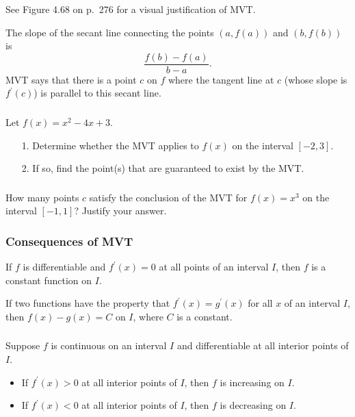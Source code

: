 \documentclass[14pt]{beamer}
\begin{document}
\begin{frame}
\small
See Figure 4.68 on p.\ 276 for a visual justification of MVT.  

\vspace{1pc} 
The slope of the secant line connecting the points $(a,f(a))$ and $(b,f(b))$ is 
\[\dfrac{f(b)-f(a)}{b-a}.\]  
MVT says that there is a point $c$ on $f$ where the tangent line at $c$ (whose slope is $f^{\prime}(c)$) is parallel to this secant line.  
\end{frame}

\begin{frame}%
\frametitle{}
\begin{ex} Let $f(x)=x^2-4x+3.$
\begin{itemize}
\item[1.] Determine whether the MVT applies to $f(x)$ on the interval $[-2,3]$.
\item[2.] If so, find the point(s) that are guaranteed to exist by the MVT.
\end{itemize}
\end{ex}
\end{frame}

\begin{frame}%
\frametitle{}
\begin{ex} How many points $c$ satisfy the conclusion of the MVT for $f(x)=x^3$ on the interval $[-1,1]$?  Justify your answer. \end{ex}
\end{frame}

\begin{frame}
\frametitle{Consequences of MVT}
\small
\begin{thm}
If $f$ is differentiable and $f^{\prime}(x)=0$ at all points of an interval $I$, then $f$ is a constant function on $I$.
\end{thm}

\vspace{1pc}
\begin{thm}
If two functions have the property that $f^{\prime}(x)=g^{\prime}(x)$ for all $x$ of an interval $I$, then $f(x)-g(x)=C$ on $I$, where $C$ is a constant.
\end{thm}
\end{frame}

\begin{frame}
\frametitle{}
\small
\begin{thm}
Suppose $f$ is continuous on an interval $I$ and differentiable at all interior points of $I$.
\begin{itemize}
\item If $f^{\prime}(x)>0$ at all interior points of $I$, then $f$ is increasing on $I$.
\item If $f^{\prime}(x)<0$ at all interior points of $I$, then $f$ is decreasing on $I$.
\end{itemize}
\end{thm}
\end{frame}
\end{document}
